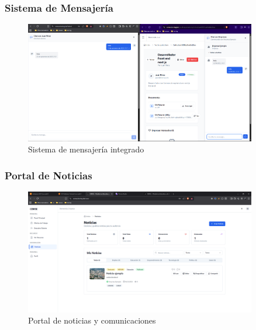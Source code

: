 \documentclass[12pt,a4paper]{article}
\begin{document}
\begin{enumerate}
\subsubsection{Sistema de Mensajería}
\begin{figure}[H]
    \centering
    \includegraphics[width=0.9\textwidth]{screenshots/features/messaging.png}
    \caption{Sistema de mensajería integrado}
    \label{fig:messaging}
\end{figure}

\subsubsection{Portal de Noticias}
\begin{figure}[H]
    \centering
    \includegraphics[width=0.9\textwidth]{screenshots/features/news.png}
    \caption{Portal de noticias y comunicaciones}
    \label{fig:news}
\end{figure}


\end{enumerate}
\end{document}
